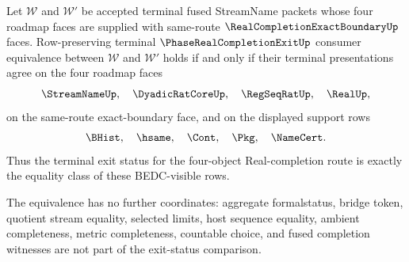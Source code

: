 \begin{theorem}
\label{thm:streamname-terminal-fusion-four-face-exit-status-equivalence}
Let $\mathcal W$ and $\mathcal W'$ be accepted terminal fused StreamName packets
whose four roadmap faces are supplied with same-route
$\RealCompletionExactBoundaryUp$ faces. Row-preserving terminal
$\PhaseRealCompletionExitUp$ consumer equivalence between $\mathcal W$ and
$\mathcal W'$ holds if and only if their terminal presentations agree on the
four roadmap faces
$$
\StreamNameUp,\quad \DyadicRatCoreUp,\quad \RegSeqRatUp,\quad \RealUp,
$$
on the same-route exact-boundary face, and on the displayed support rows
$$
\BHist,\quad \hsame,\quad \Cont,\quad \Pkg,\quad \NameCert.
$$
Thus the terminal exit status for the four-object Real-completion route is
exactly the equality class of these BEDC-visible rows.

The equivalence has no further coordinates: aggregate formalstatus, bridge
token, quotient stream equality, selected limits, host sequence equality,
ambient completeness, metric completeness, countable choice, and fused
completion witnesses are not part of the exit-status comparison.
\end{theorem}
